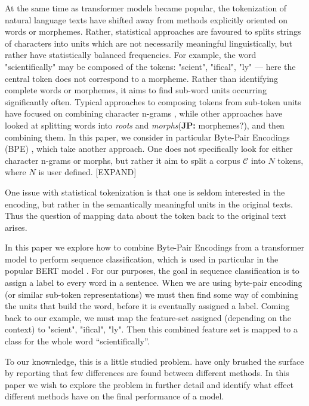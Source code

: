 \documentclass[11pt]{article}
\newcommand\jp[1]{(\textbf{JP:} #1)}
\begin{document}
	At the same time as transformer models became popular, the
        tokenization of natural language texts have shifted away from
        methods explicitly oriented on words or morphemes. Rather,
        statistical approaches are favoured to splits strings of
        characters into units which are not necessarily meaningful
        linguistically, but rather have statistically balanced
        frequencies. For example, the word "scientifically" may be
        composed of the tokens: "scient", "ifical", "ly" --- here the
        central token does not correspond to a morpheme.
        Rather than identifying complete words or morphemes, it aims
        to find sub-word units occurring significantly often. Typical
        approaches to composing tokens from sub-token units have
        focused on combining character n-grams \cite{TODO:bojanowski},
        while other approaches have looked at splitting words into
        \textit{roots} and \textit{morphs}\jp{morphemes?}, and then
        combining them. In this paper, we consider in particular
        Byte-Pair Encodings (BPE) \citep{sennrich2015neural}, which take another approach. One does not
        specifically look for either character n-grams or morphs, but
        rather it aim to split a corpus $\mathcal{C}$ into $N$ tokens,
        where $N$ is user defined. [EXPAND]

        One issue with statistical tokenization is that one is seldom
        interested in the encoding, but rather in the semantically
        meaningful units in the original texts. Thus the question of
        mapping data about the token back to the original text arises.

	In this paper we explore how to combine Byte-Pair Encodings
        from a transformer model to perform sequence
        classification, which is used in particular in the popular BERT model \citep{devlin2018bert}. For our purposes, the goal in sequence
        classification is to assign a label to every word in a
        sentence. When we are using byte-pair encoding (or similar
        sub-token representations) we must then find some way of
        combining the units that build the word, before it is
        eventually assigned a label. Coming back to our example, we
        must map the feature-set assigned (depending on the context)
        to "scient", "ifical", "ly". Then this combined feature set is
        mapped to a class for the whole word ``scientifically''.

	To our knownledge, this is a little studied
        problem. \citet{todo} have only brushed the surface by
        reporting that few differences are found between different
        methods. In this paper we wish to explore the problem in
        further detail and identify what effect different methods have
        on the final performance of a model.
\end{document}
